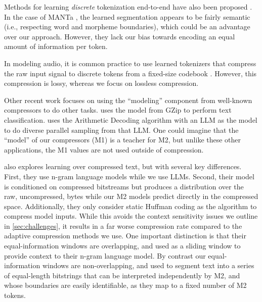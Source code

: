 Methods for learning \emph{discrete} tokenization end-to-end have also been proposed \cite{chung2017hierarchical, godey-etal-2022-manta}. In the case of MANTa \cite{godey-etal-2022-manta}, the learned segmentation appears to be fairly semantic (i.e., respecting word and morpheme boundaries), which could be an advantage over our approach. However, they lack our bias towards encoding an equal amount of information per token.

In modeling audio, it is common practice to use learned tokenizers that compress the raw input signal to discrete tokens from a fixed-size codebook \cite{van-den-oord-2017-neural, baevski-et-al-2020-wav2vec-2, chung-et-al-2021-w2v-bert, borsos-et-al-2023-audiolm}. However, this compression is lossy, whereas we focus on lossless compression.

Other recent work focuses on using the ``modeling'' component from well-known compressors to do other tasks. \citet{jiangLessMoreParameterFree2022} uses the model from GZip\ifthenelse{\equal{}}{}{$[v\mathord{=}\ifthenelse{\equal{}{8}}{256}{65\text{k}}]$} to perform text classification. \citet{pmlr-v202-vilnis23a} uses the Arithmetic Decoding algorithm with an LLM as the model to do diverse parallel sampling from that LLM\@. One could imagine that the ``model'' of our compressors (M1) is a teacher for M2, but unlike these other applications, the M1 values are not used outside of compression.

\citet{kulekci-2011-data} also explores learning over compressed text, but with several key differences. First, they use n-gram language models \cite{shannonMathematicalTheoryCommunication1948} while we use LLMs. Second, their model is conditioned on compressed bitstreams but produces a distribution over the raw, uncompressed, bytes while our M2 models predict directly in the compressed space. Additionally, they only consider static Huffman coding \cite{huffmanMethodConstructionMinimumRedundancy1952} as the algorithm to compress model inputs. While this avoids the context sensitivity issues we outline in \ref{sec:challenges}, it results in a far worse compression rate compared to the adaptive compression methods we use. One important distinction is that their equal-information windows are overlapping, and used as a sliding window to provide context to their n-gram language model. By contrast our equal-information windows are non-overlapping, and used to segment text into a series of equal-length bitstrings that can be interpreted independently by M2, and whose boundaries are easily identifiable, as they map to a fixed number of M2 tokens.

